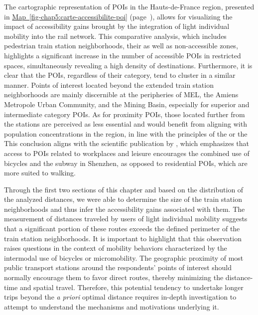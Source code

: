 \begin{refsegment}
The cartographic representation of \acrshort{POIs} in the Hauts-de-France region, presented in \hyperref[fig-chap5:carte-accessibilite-poi]{Map~\ref{fig-chap5:carte-accessibilite-poi}} (page~\pageref{fig-chap5:carte-accessibilite-poi}), allows for visualizing the impact of accessibility gains brought by the integration of light individual mobility into the rail network. This comparative analysis, which includes pedestrian train station neighborhoods, their  as well as non-accessible zones, highlights a significant increase in the number of accessible \acrshort{POIs} in restricted spaces, simultaneously revealing a high density of destinations. Furthermore, it is clear that the \acrshort{POIs}, regardless of their category, tend to cluster in a similar manner. Points of interest located beyond the extended train station neighborhoods are mainly discernible at the peripheries of \acrshort{MEL}, the Amiens Metropole Urban Community, and the Mining Basin, especially for superior and intermediate category \acrshort{POIs}. As for proximity \acrshort{POIs}, those located further from the stations are perceived as less essential and would benefit from aligning with population concentrations in the region, in line with the principles of the  or the  This conclusion aligns with the scientific publication by \textcolor{blue}{\textcite[12]{wu_measuring_2019}}, which emphasizes that access to \acrshort{POIs} related to workplaces and leisure encourages the combined use of bicycles and the subway in Shenzhen, as opposed to residential \acrshort{POIs}, which are more suited to walking.%

Through the first two sections of this chapter and based on the distribution of the analyzed distances, we were able to determine the size of the train station neighborhoods and thus infer the accessibility gains associated with them. The measurement of distances traveled by users of light individual mobility suggests that a significant portion of these routes exceeds the defined perimeter of the train station neighborhoods. It is important to highlight that this observation raises questions in the context of mobility behaviors characterized by the intermodal use of bicycles or micromobility. The geographic proximity of most public transport stations around the respondents' points of interest should normally encourage them to favor direct routes, thereby minimizing the distance-time and spatial travel. Therefore, this potential tendency to undertake longer trips beyond the \textsl{a priori} optimal distance requires in-depth investigation to attempt to understand the mechanisms and motivations underlying it.%


\end{refsegment}

